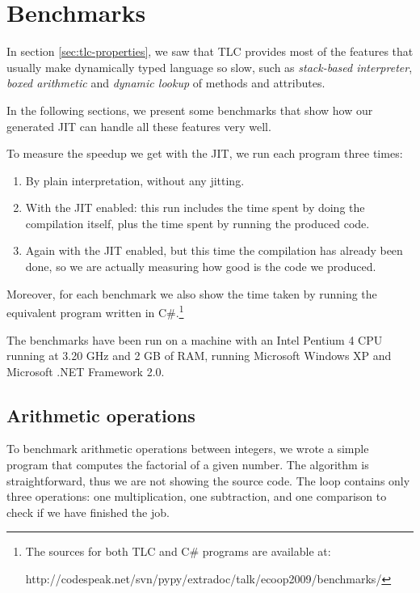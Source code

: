 \section{Benchmarks}
\label{sec:benchmarks}

In section \ref{sec:tlc-properties}, we saw that TLC provides most of the
features that usually make dynamically typed language so slow, such as
\emph{stack-based interpreter}, \emph{boxed arithmetic} and \emph{dynamic lookup} of
methods and attributes.

In the following sections, we present some benchmarks that show how our
generated JIT can handle all these features very well.

To measure the speedup we get with the JIT, we run each program three times:

\begin{enumerate}
\item By plain interpretation, without any jitting.
\item With the JIT enabled: this run includes the time spent by doing the
  compilation itself, plus the time spent by running the produced code.
\item Again with the JIT enabled, but this time the compilation has already
  been done, so we are actually measuring how good is the code we produced.
\end{enumerate}

Moreover, for each benchmark we also show the time taken by running the
equivalent program written in C\#.\footnote{The sources for both TLC and C\#
  programs are available at:

  http://codespeak.net/svn/pypy/extradoc/talk/ecoop2009/benchmarks/}

The benchmarks have been run on a machine with an Intel Pentium 4 CPU running at
3.20 GHz and 2 GB of RAM, running Microsoft Windows XP and Microsoft .NET
Framework 2.0.

\subsection{Arithmetic operations}

To benchmark arithmetic operations between integers, we wrote a simple program
that computes the factorial of a given number.  The algorithm is
straightforward, thus we are not showing the source code.  The loop contains only three operations: one
multiplication, one subtraction, and one comparison to check if we have
finished the job.

